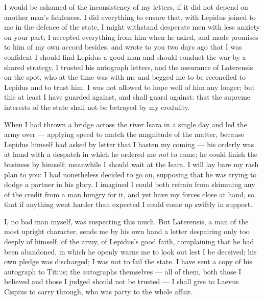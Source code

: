

 I would be ashamed of the inconsistency of my letters, if it did not depend on another man's fickleness. I did everything to ensure that, with Lepidus joined to me in the defence of the state, I might withstand desperate men with less anxiety on your part; I accepted everything from him when he asked, and made promises to him of my own accord besides, and wrote to you two days ago that I was confident I should find Lepidus a good man and should conduct the war by a shared strategy. I trusted his autograph letters, and the assurance of Laterensis on the spot, who at the time was with me and begged me to be reconciled to Lepidus and to trust him. I was not allowed to hope well of him any longer; but this at least I have guarded against, and shall guard against: that the supreme interests of the state shall not be betrayed by my credulity.

 When I had thrown a bridge across the river Isara in a single day and led the army over --- applying speed to match the magnitude of the matter, because Lepidus himself had asked by letter that I hasten my coming --- his orderly was at hand with a despatch in which he ordered me \textit{not} to come; he could finish the business by himself; meanwhile I should wait at the Isara. I will lay bare my rash plan to you: I had nonetheless decided to go on, supposing that he was trying to dodge a partner in his glory. I imagined I could both refrain from skimming any of the credit from a man hungry for it, and yet have my forces close at hand, so that if anything went harder than expected I could come up swiftly in support.

 I, no bad man myself, was suspecting this much. But Laterensis, a man of the most upright character, sends me by his own hand a letter despairing only too deeply of himself, of the army, of Lepidus's good faith, complaining that he had been abandoned, in which he openly warns me to look out lest I be deceived; his own pledge was discharged; I was not to fail the state. I have sent a copy of his autograph to Titius; the autographs themselves --- all of them, both those I believed and those I judged should not be trusted --- I shall give to Laevus Cispius to carry through, who was party to the whole affair.

